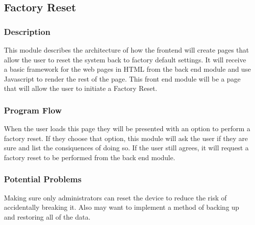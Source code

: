 
\subsection{Factory Reset}

\subsubsection{Description}

This module describes the architecture of how the frontend will create pages that allow the user to reset the system back to factory default settings.
It will receive a basic framework for the web pages in HTML from the back end module and use Javascript to render the rest of the page. 
This front end module will be a page that will allow the user to initiate a Factory Reset.


\subsubsection{Program Flow}

When the user loads this page they will be presented with an option to perform a factory reset.
If they choose that option, this module will ask the user if they are sure and list the consiquences of doing so.
If the user still agrees, it will request a factory reset to be performed from the back end module.

\subsubsection{Potential Problems}

Making sure only administrators can reset the device to reduce the risk of accidentally breaking it.
Also may want to implement a method of backing up and restoring all of the data.
